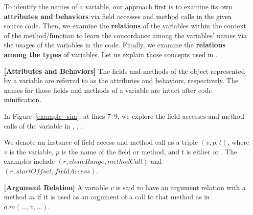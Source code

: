 \label{sec:concepts}

To identify the names of a variable, our approach first is to examine
its own {\bf attributes and behaviors} via field accesses and method calls
in the given source code. Then, we examine the {\bf relations} of the
variables within the context of the method/function to learn the
concordance among the variables' names via the usages of the variables
in the code. Finally, we examine the {\bf relations among the types}
of variables. Let us explain those concepts used in {\tool}.

\begin{definition}{\bf [Attributes and Behaviors]}
  The fields and methods of the object represented by a variable are
  referred to as the attributes and behaviors, respectively. The names
  for those fields and methods of a variable are intact after code
  minification.
\end{definition}


In Figure~\ref{example_sim}, at lines 7--9, we explore the
field accesses and method calls of the variable  in
, , .

We denote an instance of field access and method call as a triple $(v,
p, t)$, where $v$ is the variable, $p$ is the name of the field or
method, and $t$ is either  or .
The examples include $(r, cloneRange, methodCall)$ and $(r,
startOffset, fieldAccess)$.



\begin{definition}{\bf [Argument Relation]}
  A variable $v$ is said to have an argument relation with a method
  $m$ if it is used as an argument of a call to that method as in
  $o.m(...,v,...)$.
\end{definition}

